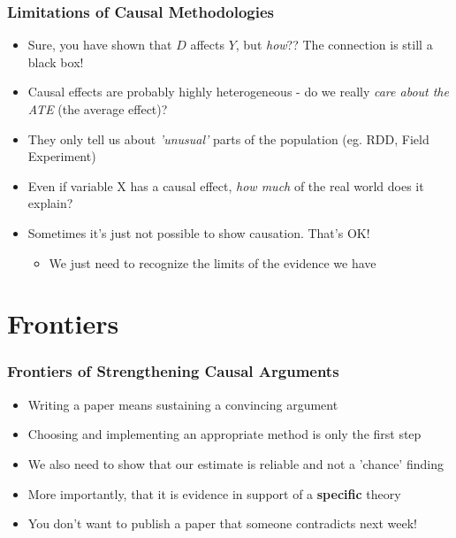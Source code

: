 \documentclass[xcolor=x11names,compress]{beamer}\usepackage[]{graphicx}\usepackage[]{color}
\renewcommand{\(}{\begin{columns}}
\renewcommand{\)}{\end{columns}}
\newcommand{\<}[1]{\begin{column}{#1}}
\renewcommand{\>}{\end{column}}
\begin{document}
\begin{frame}
\frametitle{Limitations of Causal Methodologies}
\begin{itemize}
\item Sure, you have shown that $D$ affects $Y$, but \textit{how}?? The connection is still a black box!
\pause
\item Causal effects are probably highly heterogeneous - do we really \textit{care about the ATE} (the average effect)?
\pause
\item They only tell us about \textit{'unusual'} parts of the population (eg. RDD, Field Experiment)
\pause
\item Even if variable X has a causal effect, \textit{how much} of the real world does it explain?
\pause
\item Sometimes it's just not possible to show causation. That's OK!
\begin{itemize}
\item We just need to recognize the limits of the evidence we have
\end{itemize}
\end{itemize}
\end{frame}

\section{Frontiers}

\begin{frame}
\frametitle{Frontiers of Strengthening Causal Arguments}
\begin{itemize}
\item Writing a paper means sustaining a convincing argument
\pause
\item Choosing and implementing an appropriate method is only the first step
\pause
\item We also need to show that our estimate is reliable and not a 'chance' finding
\pause
\item More importantly, that it is evidence in support of a \textbf{specific} theory
\pause
\item You don't want to publish a paper that someone contradicts next week!
\end{itemize}
\end{frame}
\end{document}
